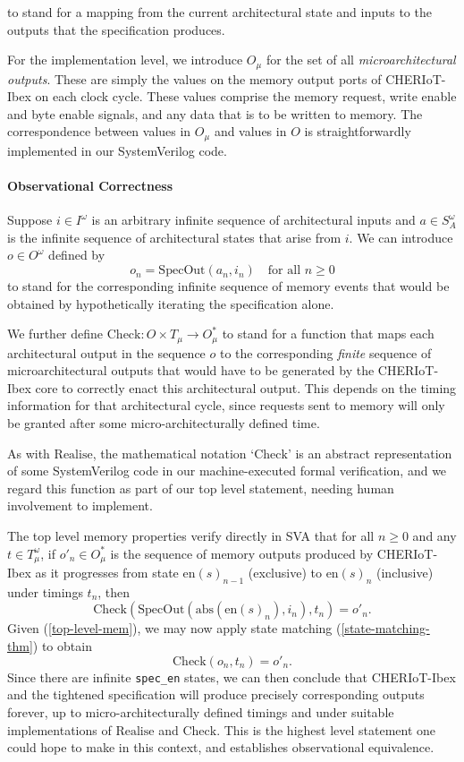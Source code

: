 \documentclass[10pt,conference]{IEEEtran}
\begin{document}
\noindent to stand for a mapping from the current architectural state and
inputs to the outputs that the specification produces.

For the implementation level, we introduce $O_\mu$ for the set
of all \textit{microarchitectural outputs}. These are simply the values on
the memory output ports of CHERIoT-Ibex on each clock cycle. These values
comprise the memory request, write enable and byte enable signals, and any
data that is to be written to memory. The correspondence between values in
$O_\mu$ and values in $O$ is straightforwardly implemented in our
SystemVerilog code.

\paragraph{Observational Correctness}
Suppose $i\in I^\omega$ is an arbitrary infinite
sequence of architectural inputs and $a\in S^\omega_A$ is the infinite
sequence of architectural states that arise from $i$. We can introduce
$o \in O^\omega$ defined by
\[
o_n = \mathrm{SpecOut}(a_n, i_n) \quad \textrm{for all $n \ge 0$}
\] 
\noindent to stand for the corresponding infinite sequence of memory events
that would be obtained by hypothetically iterating the specification alone.

We further define $\mathrm{Check} : O \times T_\mu \to O_\mu^*$ to stand for a function
that maps each architectural output in the sequence $o$ to the
corresponding \textit{finite} sequence of microarchitectural outputs that
would have to be generated by the CHERIoT-Ibex core to correctly enact this
architectural output. This depends on the timing information for that architectural
cycle, since requests sent to memory will only be granted after some micro-architecturally
defined time.

As with $\mathrm{Realise}$, the mathematical notation `$\mathrm{Check}$' is
an abstract representation of some SystemVerilog code in our machine-executed formal
verification, and we regard this function as part of our top level statement,
needing human involvement to implement.

The top level memory properties verify directly in SVA that for all $n \ge 0$ and
any $t\in T_\mu^\omega$, if $o'_n \in O_\mu^*$ is the
sequence of memory outputs produced by CHERIoT-Ibex as it
progresses from state $\mathrm{en}(s)_{n{-}1}$ (exclusive) to $\mathrm{en}(s)_{n}$
(inclusive) under timings $t_n$, then
\begin{equation}
\mathrm{Check}(\mathrm{SpecOut}(\mathrm{abs}(\mathrm{en}(s)_{n}), i_n), t_n) = o'_n.
\label{top-level-mem}
\end{equation}
\noindent Given (\ref{top-level-mem}), we may now apply state matching (\ref{state-matching-thm}) to obtain
\[
\mathrm{Check}(o_n, t_n) = o'_n.
\]
\noindent Since there are infinite \verb|spec_en| states, we can then conclude
that CHERIoT-Ibex and the tightened specification will produce precisely
corresponding outputs forever, up to micro-architecturally defined timings and
under suitable implementations of $\mathrm{Realise}$ and $\mathrm{Check}$. This is the highest level
statement one could hope to make in this context, and establishes
observational equivalence.
\end{document}
